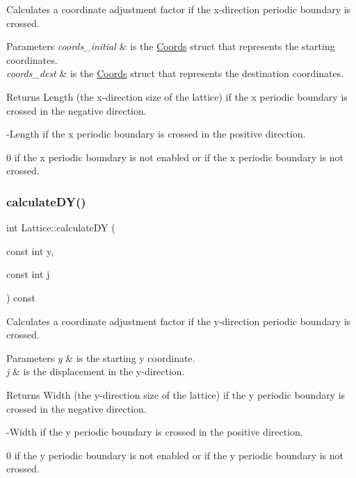Calculates a coordinate adjustment factor if the x-\/direction periodic boundary is crossed. 


\begin{DoxyParams}{Parameters}
{\em coords\+\_\+initial} & is the \hyperlink{struct_coords}{Coords} struct that represents the starting coordinates. \\
\hline
{\em coords\+\_\+dest} & is the \hyperlink{struct_coords}{Coords} struct that represents the destination coordinates. \\
\hline
\end{DoxyParams}
\begin{DoxyReturn}{Returns}
Length (the x-\/direction size of the lattice) if the x periodic boundary is crossed in the negative direction. 

-\/\+Length if the x periodic boundary is crossed in the positive direction. 

0 if the x periodic boundary is not enabled or if the x periodic boundary is not crossed. 
\end{DoxyReturn}
\mbox{\label{class_lattice_acdeca889f7df11fe299f8b7941198c83}} 
\subsubsection{\texorpdfstring{calculate\+D\+Y()}{calculateDY()}\hspace{0.1cm}{\footnotesize\ttfamily [1/2]}}
{\footnotesize\ttfamily int Lattice\+::calculate\+DY (\begin{DoxyParamCaption}\item[{const int}]{y,  }\item[{const int}]{j }\end{DoxyParamCaption}) const}



Calculates a coordinate adjustment factor if the y-\/direction periodic boundary is crossed. 


\begin{DoxyParams}{Parameters}
{\em y} & is the starting y coordinate. \\
\hline
{\em j} & is the displacement in the y-\/direction. \\
\hline
\end{DoxyParams}
\begin{DoxyReturn}{Returns}
Width (the y-\/direction size of the lattice) if the y periodic boundary is crossed in the negative direction. 

-\/\+Width if the y periodic boundary is crossed in the positive direction. 

0 if the y periodic boundary is not enabled or if the y periodic boundary is not crossed. 
\end{DoxyReturn}
\mbox{\label{class_lattice_a4e8b3577701ec0cefce595f6956b22e3}} 

